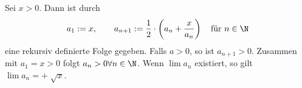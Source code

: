 Sei $x > 0$. Dann ist durch
$$a_1 := x, \qquad a_{n+1} := \frac{1}{2} \cdot \left(a_n + \frac{x}{a_n}\right) \quad \text{für $n \in \N$}$$
eine rekursiv definierte Folge gegeben.
Falls $a > 0$, so ist $a_{n+1} > 0$. Zusammen mit $a_1 = x > 0$ folgt $a_n > 0 \forall n \in \N$. Wenn $\lim a_n$ existiert, so gilt $\lim a_n = +\sqrt[]{x}$.